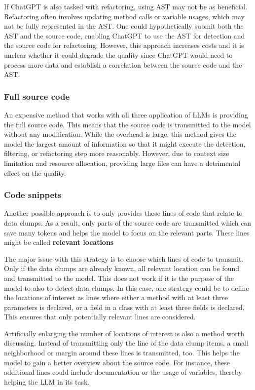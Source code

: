 If ChatGPT is also tasked with refactoring, using \ac{AST} may not be as beneficial. Refactoring often involves updating method calls or variable usages, which may not be fully represented in the \ac{AST}. One could hypothetically submit both the \ac{AST} and the source code, enabling ChatGPT to use the \ac{AST} for detection and the source code for refactoring. However, this approach increases costs and it is unclear whether it could degrade the quality since ChatGPT would need to process more data and establish a correlation between the source code and the \ac{AST}.

\subsubsection{Full source code}

An expensive method that works with all three application of \acp{LLM} is providing the full source code. This means that the source code is transmitted to the model without any modification. While the overhead is large, this method gives the model the largest amount of information so that it might execute the detection, filtering, or refactoring step more reasonably. However, due to context size limitation and resource allocation, providing large files can have a detrimental  effect on the quality. 

\subsubsection{Code snippets}


Another possible approach is to only provides those lines of code that relate to data clumps. As a result, only parts of the source code are transmitted which can save many tokens and helps the model to focus on the relevant parts. These lines might be called \textbf{relevant locations}



The major issue with this strategy is to choose which lines of code to transmit. Only if the data clumps are already known, all relevant location can be found and transmitted to the model. This does not work if it is the purpose of the model to also to detect data clumps. In this case, one strategy could be to define the locations of interest as lines where either a method with at least three parameters is declared, or a field in a class with at least three fields is declared. This ensures that only potentially relevant lines are considered.

Artificially enlarging the number of locations of interest is also a method worth discussing. Instead of transmitting only the line of the data clump items,  a small neighborhood or margin around these lines is transmitted, too. This helps the model to gain a better overview about the source code. For instance, these additional lines could include documentation or the usage of variables, thereby helping the \ac{LLM} in its task.

